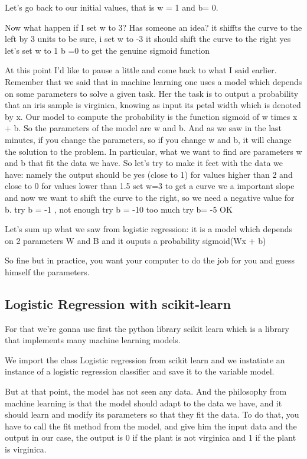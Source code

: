 \documentclass{article}
\begin{document}
Let's go back to our initial values, that is  w = 1 and b= 0.

Now what happen if I set w to 3? Has someone an idea?
it shiffts the curve to the left by 3 units
to be sure, i set w to -3 it should shift the curve to the right
yes
let's set w to 1 b =0 to get the genuine sigmoid function

At this point I'd like to pause a little and come back to what I said earlier.
Remember that we said that in machine learning one uses a model which depends on some parameters to solve a given task.
Her the task is to output a probability that an iris sample is virginica, 
knowing as input its petal width which is denoted by x. 
Our model to compute the probability is the function 
sigmoid of w times x + b.
So the parameters of the model are w and b.
And as we saw in the last minutes, if you change the parameters, so if you change w and b, 
it will change the solution to the problem.
In particular, what we want to find are parameters w and b that fit the data we have.
So let's try to make it feet with the data we have: namely the output should be yes 
(close to 1) for values higher than 2
and close to 0 for values lower than 1.5
set w=3 to get a curve we a important slope
and now we want to shift the curve to the right, so we need a negative value for b.
try b = -1 , not enough
try b = -10 too much
try b= -5 OK

Let's sum up what we saw from logistic regression:
it is a model which depends on 2 parameters W  and B  and
it ouputs a probability 
sigmoid(Wx + b)

So fine but in practice, you want your computer to do the job for you and guess himself the parameters.

\subsection{Logistic Regression with scikit-learn}

For that we're gonna use first the python library scikit learn which is a library that implements many machine learning models.

We import the class Logistic regression from scikit learn
and we instatiate an instance of a logistic regression classifier and save it to the variable model.

But at that point, the model has not seen any data.
And the philosophy from machine learning is that the model should adapt to the 
data we have, and it should learn and modify its parameters so that they fit  the data.
To do that, you have to call the fit method from the model, 
and give him the input data and the output in our case, the output 
is 0 if the plant is not virginica and 1 if the plant is virginica.
\end{document}
